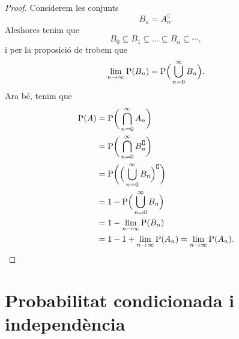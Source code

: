 \documentclass[../../main.tex]{subfiles}
\begin{document}
    \begin{proof}
        Considerem les conjunts
        \[
            B_{n}=A_{n}^{\complement}.
        \]
        Aleshores tenim que
        \[
            B_{0}\subseteq B_{1}\subseteq\dots\subseteq B_{n}\subseteq\cdots,
        \]
        i per la proposició de  trobem que
        \[
            \lim_{n\to\infty}\mathrm{P}(B_{n})=\mathrm{P}\Big(\bigcup_{n=0}^{\infty}B_{n}\Big).
        \]
        Ara bé, tenim que
        \begin{align*}
            \mathrm{P}(A)&=\mathrm{P}\bigg(\bigcap_{n=0}^{\infty}A_{n}\bigg) \\
            &=\mathrm{P}\bigg(\bigcap_{n=0}^{\infty}B_{n}^{\complement}\bigg) \\
            &=\mathrm{P}\bigg(\Big(\bigcup_{n=0}^{\infty}B_{n}\Big)^{\complement}\bigg) \\
            &=1-\mathrm{P}\Big(\bigcup_{n=0}^{\infty}B_{n}\Big) \\
            &=1-\lim_{n\to\infty}\mathrm{P}(B_{n}) \\
            &=1-1+\lim_{n\to\infty}\mathrm{P}(A_{n})=\lim_{n\to\infty}\mathrm{P}(A_{n}).\qedhere
        \end{align*}
    \end{proof}
\section{Probabilitat condicionada i independència}
\end{document}
